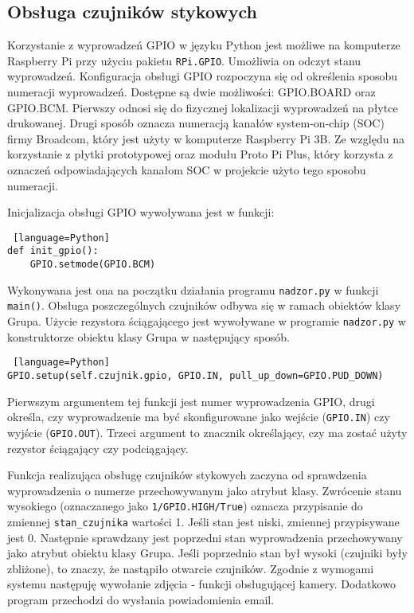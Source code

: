 \documentclass[a4paper,12pt,twoside]{article}
\begin{document}
\subsection{Obsługa czujników stykowych}
Korzystanie z wyprowadzeń GPIO w języku Python jest możliwe na komputerze Raspberry Pi przy użyciu pakietu \texttt{RPi.GPIO}. Umożliwia on odczyt stanu wyprowadzeń. Konfiguracja obsługi GPIO rozpoczyna się od określenia sposobu numeracji wyprowadzeń. Dostępne są dwie możliwości: GPIO.BOARD oraz GPIO.BCM. Pierwszy odnosi się do fizycznej lokalizacji wyprowadzeń na płytce drukowanej. Drugi sposób oznacza numeracją kanałów system-on-chip (SOC) firmy Broadcom, który jest użyty w komputerze Raspberry Pi 3B. Ze względu na korzystanie z płytki prototypowej oraz modułu Proto Pi Plus, który korzysta z oznaczeń odpowiadających kanałom SOC w projekcie użyto tego sposobu numeracji.

Inicjalizacja obsługi GPIO wywoływana jest w funkcji:  
\begin{lstlisting} [language=Python]
def init_gpio():
    GPIO.setmode(GPIO.BCM)
\end{lstlisting}
Wykonywana jest ona na początku działania programu \texttt{nadzor.py} w funkcji \texttt{main()}. Obsługa poszczególnych czujników odbywa się w ramach obiektów klasy Grupa. Użycie rezystora ściągającego jest wywoływane w programie \texttt{nadzor.py} w konstruktorze obiektu klasy Grupa w następujący sposób.
\begin{lstlisting} [language=Python]
GPIO.setup(self.czujnik.gpio, GPIO.IN, pull_up_down=GPIO.PUD_DOWN)
\end{lstlisting}
Pierwszym argumentem tej funkcji jest numer wyprowadzenia GPIO, drugi określa, czy wyprowadzenie ma być skonfigurowane jako wejście (\texttt{GPIO.IN}) czy wyjście (\texttt{GPIO.OUT}). Trzeci argument to znacznik określający, czy ma zostać użyty rezystor ściągający czy podciągający.

Funkcja realizująca obsługę czujników stykowych zaczyna od sprawdzenia wyprowadzenia o numerze przechowywanym jako atrybut klasy. Zwrócenie stanu wysokiego (oznaczanego jako \texttt{1/GPIO.HIGH/True}) oznacza przypisanie do zmiennej \texttt{stan{\_}czujnika} wartości 1. Jeśli stan jest niski, zmiennej przypisywane jest 0. Następnie sprawdzany jest poprzedni stan wyprowadzenia przechowywany jako atrybut obiektu klasy Grupa. Jeśli poprzednio stan był wysoki (czujniki były zbliżone), to znaczy, że nastąpiło otwarcie czujników. Zgodnie z wymogami systemu następuję wywołanie zdjęcia - funkcji obsługującej kamery. Dodatkowo program przechodzi do wysłania powiadomienia email.
\end{document}
